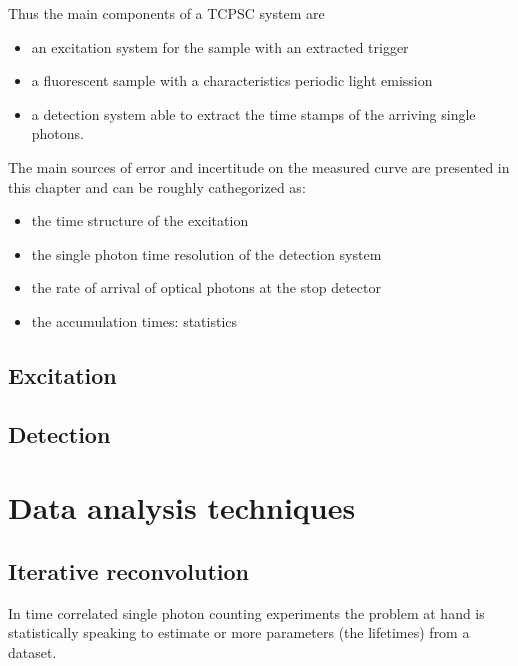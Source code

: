 Thus the main components of a TCPSC system are
\begin{itemize}
\item an excitation system for the sample with an extracted trigger
\item a fluorescent sample with a characteristics periodic light emission
\item a detection system able to extract the time stamps of the arriving single photons.
\end{itemize}
The main sources of error and incertitude on the measured curve are presented in this chapter and can be roughly cathegorized as:
\begin{itemize}
\item the time structure of the excitation
\item the single photon time resolution of the detection system
\item the rate of arrival of optical photons at the stop detector
\item the accumulation times: statistics
\end{itemize}

\subsection{Excitation}
% 


\subsection{Detection}

\section{Data analysis techniques}


\subsection{Iterative reconvolution}
In time correlated single photon counting experiments the problem at hand is statistically speaking to estimate or more parameters (the lifetimes) from a dataset.

